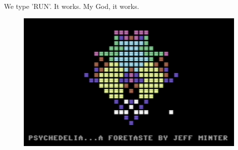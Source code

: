 We type 'RUN'. It works. My God, it works.

\begin{figure}[H]
    \centering
    \begin{adjustbox}{width=9cm,center}
      \includegraphics[width=12cm]{src/listing/itworks.png}%
    \end{adjustbox}
\end{figure}

